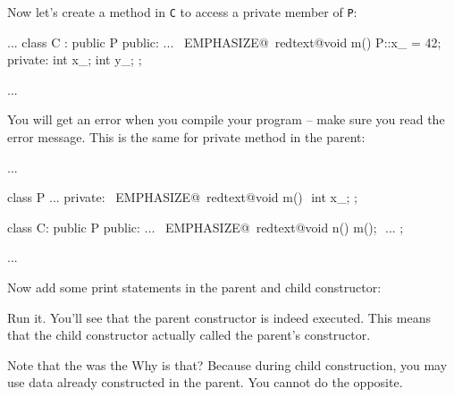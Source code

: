 Now let's create a method in \verb!C! to access a private member of
\verb!P!:
\begin{console}[commandchars=\~\@\$]
...
class C : public P
{
public:
        ...
        ~EMPHASIZE@~redtext@void m() { P::x_ = 42; }$$
private:
        int x_;
        int y_;
};

... 
\end{console}

You will get an error when you compile your program -- make sure you
read the error message. This is the same for private method in the
parent:
\begin{console}[commandchars=\~\@\$]
...

class P
{     
...
private:
        ~EMPHASIZE@~redtext@void m() {}$$
        int x_;
};

class C: public P
{
public:
        ...
        ~EMPHASIZE@~redtext@void n() { m(); }$$
        ...
};

...
\end{console}

\newpage{}

Now add some print statements in the parent and child constructor:

Run it. You'll see that the parent constructor is indeed executed. This means that the child constructor actually called the parent's constructor.

Note that the  was  the  Why is that? Because during child construction, you may use data already constructed in the parent. You cannot do the opposite.

